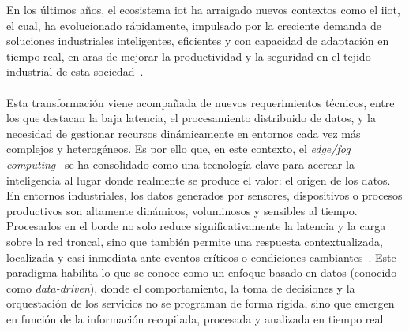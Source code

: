 En los últimos años, el ecosistema \gls{iot} ha arraigado nuevos contextos como el \gls{iiot}, el cual, ha evolucionado rápidamente, impulsado por la creciente demanda de soluciones industriales inteligentes, eficientes y con capacidad de adaptación en tiempo real, en aras de mejorar la productividad y la seguridad en el tejido industrial de esta sociedad~\cite{boyes2018industrial,rojas2024survey}.\\
\\
Esta transformación viene acompañada de nuevos requerimientos técnicos, entre los que destacan la baja latencia, el procesamiento distribuido de datos, y la necesidad de gestionar recursos dinámicamente en entornos cada vez más complejos y heterogéneos.  Es por ello que, en este contexto, el \textit{edge/fog computing}~\cite{qiu2020edge} se ha consolidado como una tecnología clave para acercar la inteligencia al lugar donde realmente se produce el valor: el origen de los datos. En entornos industriales, los datos generados por sensores, dispositivos o procesos productivos son altamente dinámicos, voluminosos y sensibles al tiempo. Procesarlos en el borde no solo reduce significativamente la latencia y la carga sobre la red troncal, sino que también permite una respuesta contextualizada, localizada y casi inmediata ante eventos críticos o condiciones cambiantes~\cite{hou2023trends}. Este paradigma habilita lo que se conoce como un enfoque basado en datos (conocido como \textit{data-driven}), donde el comportamiento, la toma de decisiones y la orquestación de los servicios no se programan de forma rígida, sino que emergen en función de la información recopilada, procesada y analizada en tiempo real.\\
\\
